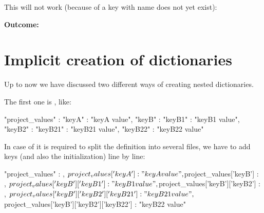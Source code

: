 \vspace{2ex}

This will not work (because of a key with name  does not yet exist):

\vspace{2ex}


\vspace{2ex}

\textbf{Outcome:}



\newpage

\section{Implicit creation of dictionaries}\label{implicit-creation}

Up to now we have discussed two different ways of creating nested dictionaries.

The first one is , like:

\begin{pythoncode}
{
   "project_values" : {"keyA" : "keyA value",
                       "keyB" : {"keyB1" : "keyB1 value",
                                 "keyB2" : {"keyB21" : "keyB21 value",
                                            "keyB22" : "keyB22 value"}}}
}
\end{pythoncode}

In case of it is required to split the definition into several files, we have to add keys (and also the initialization) line by line:

\begin{pythoncode}
{
   "project_values" : {},
   ${project_values}['keyA'] : "keyA value",
   ${project_values}['keyB'] : {},
   ${project_values}['keyB']['keyB1'] : "keyB1 value",
   ${project_values}['keyB']['keyB2'] : {},
   ${project_values}['keyB']['keyB2']['keyB21'] : "keyB21 value",
   ${project_values}['keyB']['keyB2']['keyB22'] : "keyB22 value"
}
\end{pythoncode}

